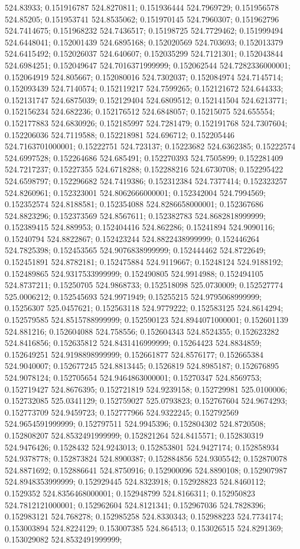 524.83933; 0.151916787 524.8270811; 0.151936444 524.7969729; 0.151956578 524.85205; 0.151953741 524.8535062; 0.151970145 524.7960307; 0.151962796 524.7414675; 0.151968232 524.7436517; 0.15198725 524.7729462; 0.151999494 524.6448041; 0.152001439 524.6895168; 0.152020569 524.703693; 0.152013379 524.6415492; 0.152026037 524.640607; 0.152035299 524.7121301; 0.152043844 524.6984251; 0.152049647 524.7016371999999; 0.152062544 524.7282336000001; 0.152064919 524.805667; 0.152080016 524.7302037; 0.152084974 524.7145714; 0.152093439 524.7140574; 0.152119217 524.7599265; 0.152121672 524.644333; 0.152131747 524.6875039; 0.152129404 524.6809512; 0.152141504 524.6213771; 0.152156234 524.682236; 0.152176512 524.6848057; 0.15215075 524.655554; 0.152177883 524.6830926; 0.152185997 524.7281479; 0.152191768 524.7307604; 0.152206036 524.7119588; 0.152218981 524.696712; 0.152205446 524.7163701000001; 0.15222751 524.723137; 0.15223682 524.6362385; 0.15222574 524.6997528; 0.152264686 524.685491; 0.152270393 524.7505899; 0.152281409 524.7217237; 0.15227355 524.6718288; 0.152288216 524.6730708; 0.152295422 524.6598797; 0.152296682 524.7419386; 0.152312384 524.7377414; 0.152323257 524.8260961; 0.152323001 524.8062666000001; 0.152342004 524.7994569; 0.152352574 524.8188581; 0.152354088 524.8286658000001; 0.152367686 524.8823296; 0.152373569 524.8567611; 0.152382783 524.8682818999999; 0.152389415 524.889953; 0.152404416 524.862286; 0.15241894 524.9090116; 0.15240794 524.8822867; 0.152423244 524.8822438999999; 0.152446264 524.7825398; 0.152453565 524.9076838999999; 0.152444462 524.8722649; 0.152451891 524.8782181; 0.152475884 524.9119667; 0.15248124 524.9188192; 0.152489865 524.9317533999999; 0.152490805 524.9914988; 0.152494105 524.8737211; 0.15250705 524.9868733; 0.152518098 525.0730009; 0.152527774 525.0006212; 0.152545693 524.9971949; 0.15255215 524.9795068999999; 0.15256307 525.0457621; 0.152563118 524.9779222; 0.152583125 524.8614294; 0.152579585 524.8515788999999; 0.152590123 524.8944071000001; 0.152601139 524.881216; 0.152604088 524.758556; 0.152604343 524.8524355; 0.152623282 524.8416856; 0.152635812 524.8431416999999; 0.15264423 524.8834859; 0.152649251 524.9198898999999; 0.152661877 524.8576177; 0.152665384 524.9040007; 0.152677245 524.8813445; 0.1526819 524.8985187; 0.152676895 524.9078124; 0.152705654 524.9464863000001; 0.15270347 524.8569753; 0.152719427 524.8676395; 0.152721819 524.9239158; 0.152729981 525.0100006; 0.152732085 525.0341129; 0.152759027 525.0793823; 0.152767604 524.9674293; 0.152773709 524.9459723; 0.152777966 524.9322245; 0.152792569 524.9654591999999; 0.152797511 524.9945396; 0.152804302 524.8720508; 0.152808207 524.8532491999999; 0.152821264 524.8415571; 0.152830319 524.9476426; 0.1528432 524.9243013; 0.152853801 524.9427174; 0.152858934 524.9378778; 0.152873824 524.8900387; 0.152884856 524.9305542; 0.152870078 524.8871692; 0.152886641 524.8750916; 0.152900096 524.8890108; 0.152907987 524.8948353999999; 0.152929445 524.8323918; 0.152928823 524.8460112; 0.1529352 524.8356468000001; 0.152948799 524.8166311; 0.152950823 524.7812121000001; 0.152962604 524.8121341; 0.152967036 524.7828396; 0.152983121 524.768278; 0.152985258 524.8330343; 0.152988223 524.7734174; 0.153003894 524.8224129; 0.153007385 524.864513; 0.153026515 524.8291369; 0.153029082 524.8532491999999; 